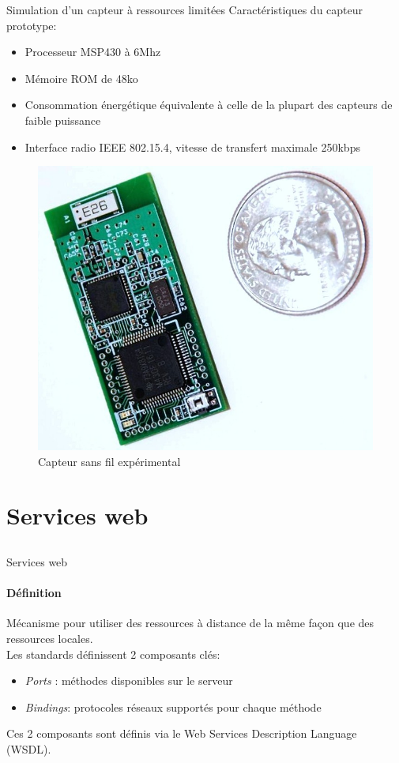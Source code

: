 \begin{frame}{Simulation d'un capteur à ressources limitées}
Caractéristiques du capteur prototype:
\begin{itemize}
\item Processeur MSP430 à \alert{6Mhz}
\item Mémoire ROM de \alert{48ko}
\item Consommation énergétique équivalente à celle de la plupart des capteurs de faible puissance
\item Interface radio IEEE 802.15.4, vitesse de transfert maximale 250kbps
\end{itemize}
\begin{figure}
  \centering
  \includegraphics[scale=0.15]{figures/tws08-000.jpg}
  \caption{Capteur sans fil expérimental}
 \end{figure} 
\end{frame}

\section{Services web}
\subsection{}
\begin{frame}{Services web}
\framesubtitle{Définition}
Mécanisme pour utiliser des ressources à distance de la même façon que des ressources locales.\\
Les standards définissent 2 composants clés:
\begin{itemize}
\item \textit{Ports} : méthodes disponibles sur le serveur  
\item \textit{Bindings}: protocoles réseaux supportés pour chaque méthode
\end{itemize}
Ces 2 composants sont définis via le Web Services Description Language (WSDL).%
\end{frame}

